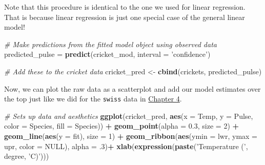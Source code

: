 \documentclass[
]{book}
\newenvironment{Shaded}{\begin{snugshade}}{\end{snugshade}}
\newcommand{\CommentTok}[1]{\textcolor[rgb]{0.56,0.35,0.01}{\textit{#1}}}
\newcommand{\DataTypeTok}[1]{\textcolor[rgb]{0.13,0.29,0.53}{#1}}
\newcommand{\DecValTok}[1]{\textcolor[rgb]{0.00,0.00,0.81}{#1}}
\newcommand{\FloatTok}[1]{\textcolor[rgb]{0.00,0.00,0.81}{#1}}
\newcommand{\KeywordTok}[1]{\textcolor[rgb]{0.13,0.29,0.53}{\textbf{#1}}}
\newcommand{\NormalTok}[1]{#1}
\newcommand{\OperatorTok}[1]{\textcolor[rgb]{0.81,0.36,0.00}{\textbf{#1}}}
\newcommand{\OtherTok}[1]{\textcolor[rgb]{0.56,0.35,0.01}{#1}}
\newcommand{\StringTok}[1]{\textcolor[rgb]{0.31,0.60,0.02}{#1}}
\begin{document}
Note that this procedure is identical to the one we used for linear regression. That is because linear regression is just one special case of the general linear model!

\begin{Shaded}
\begin{Highlighting}[]
\CommentTok{# Make predictions from the fitted model object using observed data}
\NormalTok{predicted_pulse =}\StringTok{ }\KeywordTok{predict}\NormalTok{(cricket_mod, }\DataTypeTok{interval =} \StringTok{'confidence'}\NormalTok{)}

\CommentTok{# Add these to the cricket data}
\NormalTok{cricket_pred <-}\StringTok{ }\KeywordTok{cbind}\NormalTok{(crickets, predicted_pulse)}
\end{Highlighting}
\end{Shaded}

Now, we can plot the raw data as a scatterplot and add our model estimates over the top just like we did for the \texttt{swiss} data in \protect\hyperlink{Chapter4}{Chapter 4}.

\begin{Shaded}
\begin{Highlighting}[]
\CommentTok{# Sets up data and aesthetics}
\KeywordTok{ggplot}\NormalTok{(cricket_pred, }
       \KeywordTok{aes}\NormalTok{(}\DataTypeTok{x =}\NormalTok{ Temp, }\DataTypeTok{y =}\NormalTok{ Pulse, }\DataTypeTok{color =}\NormalTok{ Species, }\DataTypeTok{fill =}\NormalTok{ Species)) }\OperatorTok{+}
\StringTok{  }\KeywordTok{geom_point}\NormalTok{(}\DataTypeTok{alpha =} \FloatTok{0.3}\NormalTok{, }\DataTypeTok{size =} \DecValTok{2}\NormalTok{) }\OperatorTok{+}
\StringTok{  }\KeywordTok{geom_line}\NormalTok{(}\KeywordTok{aes}\NormalTok{(}\DataTypeTok{y =}\NormalTok{ fit), }\DataTypeTok{size =} \DecValTok{1}\NormalTok{) }\OperatorTok{+}
\StringTok{  }\KeywordTok{geom_ribbon}\NormalTok{(}\KeywordTok{aes}\NormalTok{(}\DataTypeTok{ymin =}\NormalTok{ lwr, }\DataTypeTok{ymax =}\NormalTok{ upr, }\DataTypeTok{color =} \OtherTok{NULL}\NormalTok{), }\DataTypeTok{alpha =} \FloatTok{.3}\NormalTok{)}\OperatorTok{+}
\StringTok{  }\KeywordTok{xlab}\NormalTok{(}\KeywordTok{expression}\NormalTok{(}\KeywordTok{paste}\NormalTok{(}\StringTok{'Temperature ('}\NormalTok{, degree, }\StringTok{'C)'}\NormalTok{)))  }
\end{Highlighting}
\end{Shaded}
\end{document}
